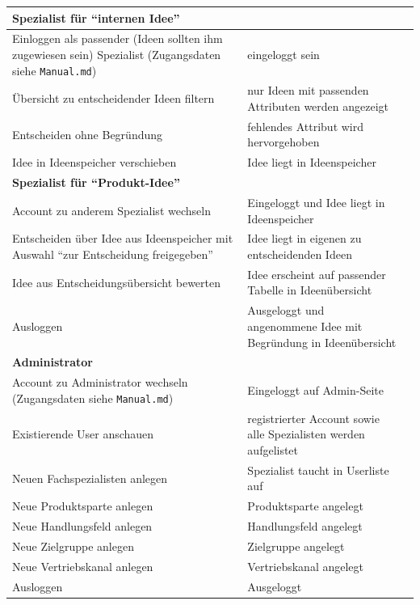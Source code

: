 \begin{center}
\begin{longtable}{|p{}|p{}|p{}|}
        \textbf{Spezialist für \enquote{internen Idee}} & &\\
        \hline
        Einloggen als passender (Ideen sollten ihm zugewiesen sein) Spezialist (Zugangsdaten siehe \texttt{Manual.md})& eingeloggt sein &\\
        \hline
        Übersicht zu entscheidender Ideen filtern & nur Ideen mit passenden Attributen werden angezeigt &\\
        \hline
        Entscheiden ohne Begründung & fehlendes Attribut wird hervorgehoben &\\
        \hline
        Idee in Ideenspeicher verschieben & Idee liegt in Ideenspeicher &\\
        \hline
        \hline

        \textbf{Spezialist für \enquote{Produkt-Idee}} & &\\
        \hline
        Account zu anderem Spezialist wechseln & Eingeloggt und Idee liegt in Ideenspeicher &\\
        \hline
        Entscheiden über Idee aus Ideenspeicher mit Auswahl  \enquote{zur Entscheidung freigegeben} & Idee liegt in eigenen zu entscheidenden Ideen &\\
        \hline
        Idee aus Entscheidungsübersicht bewerten & Idee erscheint auf passender Tabelle in Ideenübersicht &\\
        \hline
        Ausloggen & Ausgeloggt und angenommene Idee mit Begründung in Ideenübersicht &\\
        \hline
        \hline

        \textbf{Administrator} & &\\
        \hline
        Account zu Administrator wechseln (Zugangsdaten siehe \texttt{Manual.md})& Eingeloggt auf Admin-Seite &\\
        \hline
        Existierende User anschauen & registrierter Account sowie alle Spezialisten werden aufgelistet &\\
        \hline
        Neuen Fachspezialisten anlegen & Spezialist taucht in Userliste auf &\\
        \hline
        Neue Produktsparte anlegen & Produktsparte angelegt &\\
        \hline
        Neue Handlungsfeld anlegen & Handlungsfeld angelegt &\\
        \hline
        Neue Zielgruppe anlegen & Zielgruppe angelegt &\\
        \hline
        Neue Vertriebskanal anlegen & Vertriebskanal angelegt &\\
        \hline
        Ausloggen & Ausgeloggt &\\
        \hline
    \end{longtable}
\end{center}

